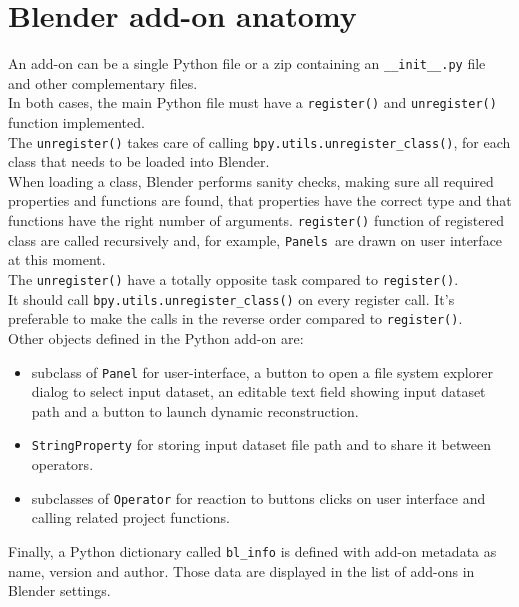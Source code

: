 \section{Blender add-on anatomy}
An add-on can be a single Python file or a zip containing an \texttt{\_\_init\_\_.py} file and other complementary files. \\
In both cases, the main Python file must have a \texttt{register()} and \texttt{unregister()} function implemented. \\
The \texttt{unregister()} takes care of calling \texttt{bpy.utils.unregister\_class()}, for each class that needs to be loaded into Blender. \\
When loading a class, Blender performs sanity checks, making sure all required properties and functions are found, that properties have the correct type and that functions have the right number of arguments. \texttt{register()} function of registered class are called recursively and, for example, \texttt{Panels }are drawn on user interface at this moment. \\
The \texttt{unregister()} have a totally opposite task compared to \texttt{register()}. \\
It should call \texttt{bpy.utils.unregister\_class()} on every register call. It's preferable to make the calls in the reverse order compared to \texttt{register()}. \\
Other objects defined in the Python add-on are:
\begin{itemize}
\item subclass of \texttt{Panel} for user-interface, a button to open a file system explorer dialog to select input dataset, an editable text field showing input dataset path and a button to launch dynamic reconstruction.
\item \texttt{StringProperty} for storing input dataset file path and to share it between operators.
\item subclasses of \texttt{Operator} for reaction to buttons clicks on user interface and calling related project functions. 
\end{itemize}
Finally, a Python dictionary called \texttt{bl\_info} is defined with add-on metadata as name, version and author. Those data are displayed in the list of add-ons in Blender settings.

